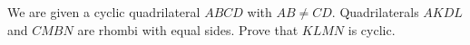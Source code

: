 We are given a cyclic quadrilateral $ABCD$ with $AB\neq CD$. Quadrilaterals $AKDL$ and $CMBN$ are rhombi with equal sides. Prove that $KLMN$ is cyclic.
